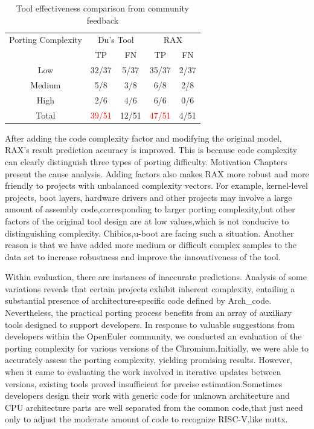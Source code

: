 \documentclass[sigconf,screen,review,anonymous]{acmart}
\begin{document}
\begin{table}
  \caption{Tool effectiveness comparison from community feedback}
  \label{tab:effectiveness}
  \begin{tabular}{ccccc}
    \toprule
    Porting Complexity & \multicolumn{2}{c}{Du's Tool} & \multicolumn{2}{c}{RAX} \\
     & TP & FN & TP & FN \\
    \midrule
    Low &32/37 & 5/37 & 35/37 & 2/37 \\
    Medium & 5/8 & 3/8 & 6/8 & 2/8 \\
    High & 2/6 & 4/6 & 6/6 & 0/6 \\
    \midrule
    Total & \textcolor{red}{39/51} & 12/51& \textcolor{red}{47/51} & 4/51 \\
      \bottomrule
\end{tabular}
\end{table}

After adding the code complexity factor and modifying the original model, RAX's result prediction accuracy is improved.
This is because code complexity can clearly distinguish three types of porting difficulty.
Motivation Chapters present the cause analysis.
Adding factors also makes RAX more robust and more friendly to projects with unbalanced complexity vectors.
For example, kernel-level projects, boot layers, hardware drivers and other projects may involve a large amount of assembly code,corresponding to larger porting complexity,but other factors of the original tool design are at low values,which is not conducive to distinguishing complexity.
Chibios,u-boot are facing such a situation. Another reason is that we have added more medium or difficult complex samples to the data set to increase robustness and improve the innovativeness of the tool.     




Within evaluation, there are instances of inaccurate predictions. Analysis of some variations reveals that certain projects exhibit inherent complexity, entailing a substantial presence of architecture-specific code defined by Arch\_code.
Nevertheless, the practical porting process benefits from an array of auxiliary tools designed to support developers. In response to valuable suggestions from developers within the OpenEuler community, we conducted an evaluation of the porting complexity for various versions of the Chromium.Initially, we were able to accurately assess the porting complexity, yielding promising results. However, when it came to evaluating the work involved in iterative updates between versions, existing tools proved insufficient for precise estimation.Sometimes developers design their work with generic code for unknown architecture and CPU architecture parts are well separated from the common code,that just need only to adjust the moderate amount of code to recognize RISC-V,like nuttx.
\end{document}

